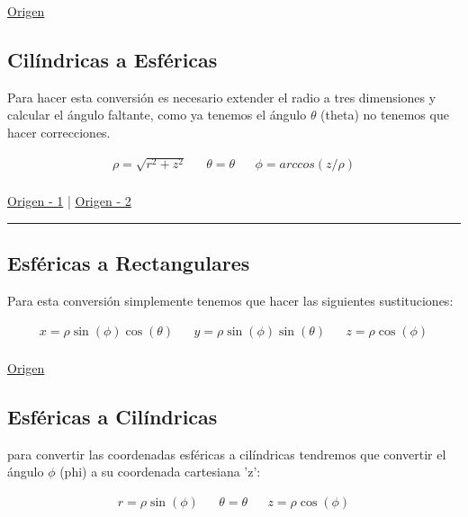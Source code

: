 \documentclass{article}
\begin{document}
\href{https://www.neurochispas.com/wiki/coordenadas-cilindricas-a-cartesianas/}{Origen}

\subsection{Cilíndricas a Esféricas}
\label{sec:org433948f}
Para hacer esta conversión es necesario extender el radio a tres dimensiones y calcular el ángulo faltante, como ya tenemos el ángulo \(\theta\) (theta) no tenemos que hacer correcciones.

\[\begin{aligned}
 \rho = \sqrt{r^2+z^2} && 
 \theta = \theta  &&
 \phi = arccos\left( z/\rho \right) \\
\end{aligned}\] 

\href{http://www.learningaboutelectronics.com/Articulos/Calculadora-de-conversion-de-coordenadas-cilindricas-a-esfericas.php}{Origen - 1} | \href{https://math.libretexts.org/Bookshelves/Calculus/Book:\_Calculus\_(OpenStax)/12:\_Vectors\_in\_Space/12.7:\_Cylindrical\_and\_Spherical\_Coordinates\#:\~:text=To\%20convert\%20a\%20point\%20from,r2+z2).}{Origen - 2}

\noindent\rule{\textwidth}{0.5pt}

\subsection{Esféricas a Rectangulares}
\label{sec:orgad9d011}
Para esta conversión simplemente tenemos que hacer las siguientes sustituciones:

\[\begin{aligned}
 x = \rho \sin(\phi)\cos(\theta) && 
 y = \rho \sin(\phi)\sin(\theta) &&
 z = \rho \cos(\phi) \\
\end{aligned}\] 

\href{https://www.neurochispas.com/wiki/coordenadas-esfericas-a-cartesianas/}{Origen}

\subsection{Esféricas a Cilíndricas}
\label{sec:org60bbd83}
para convertir las coordenadas esféricas a cilíndricas tendremos que convertir el ángulo \(\phi\) (phi) a su coordenada cartesiana 'z':

\[\begin{aligned}
 r = \rho \sin(\phi) && 
 \theta = \theta &&
 z = \rho \cos(\phi) \\
\end{aligned}\] 
\end{document}
